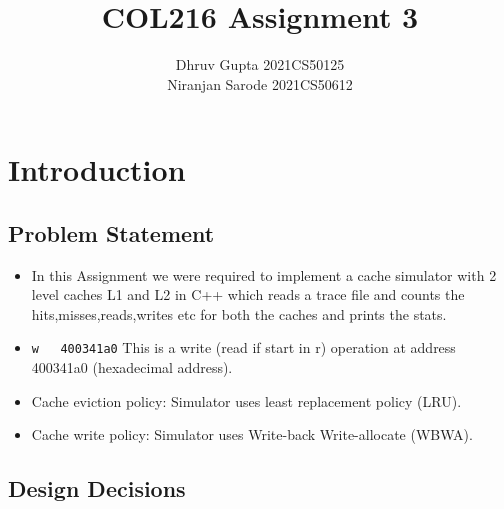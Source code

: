 \documentclass{article}
\title{COL216 Assignment 3}
\author{Dhruv Gupta 2021CS50125 \\ Niranjan Sarode 2021CS50612}
\date{}
\begin{document}
\maketitle

\section{Introduction}

\subsection{Problem Statement}
\begin{itemize}
    \item In this Assignment we were required to implement a cache simulator with 2 level caches L1 and L2 in C++ which reads a trace file and counts the hits,misses,reads,writes etc for both the caches and prints the stats.
    \item \verb|w	400341a0|  This is a write (read if start in r) operation at address 400341a0 (hexadecimal address).
    \item Cache eviction policy: Simulator uses least replacement policy (LRU).
    \item Cache write policy: Simulator uses Write-back Write-allocate (WBWA).
\end{itemize}

\subsection{Design Decisions}
\end{document}
